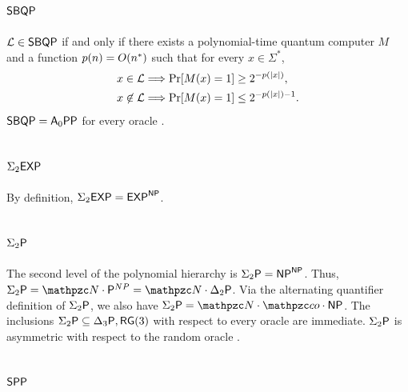\subsection{$\mathsf{SBQP}$}

$\mathcal{L}\in\mathsf{SBQP}$ if and only if there exists a polynomial-time quantum 
computer $M$ and a function $p(n)=O(n^*)$ such that for every $x\in\Sigma^*$,
\begin{align*}
x\in\mathcal{L}&\Longrightarrow\Pr[M(x)=1]\geq 2^{-p(|x|)}, \\
x\not\in\mathcal{L}&\Longrightarrow\Pr[M(x)=1]\leq 2^{-p(|x|)-1}.
\end{align*}
$\mathsf{SBQP}=\mathsf{A}_0\mathsf{PP}$ for every oracle \cite{kuperberg2009hard}.

\subsection{$\Sigma_2\mathsf{EXP}$}

By definition, $\Sigma_2\mathsf{EXP}=\mathsf{EXP}^{\mathsf{NP}}$.

\subsection{$\Sigma_2\mathsf{P}$}

The second level of the polynomial hierarchy is $\Sigma_2\mathsf{P}=\mathsf{NP}^{\mathsf{NP}}$. Thus, 
$\Sigma_2\sP=\cN\cdot\sP^{NP}=\cN\cdot\Delta_2\sP$. Via the alternating 
quantifier definition of $\Sigma_2\mathsf{P}$, we also have 
$\Sigma_2\sP=\cN\cdot\cco\cdot\NP$. The inclusions 
$\Sigma_2\mathsf{P}\subseteq\Delta_3\mathsf{P},\mathsf{RG}(3)$ with respect to every oracle are 
immediate. $\Sigma_2\mathsf{P}$ is asymmetric with respect to the random oracle 
\cite{rossman2015average}.

\subsection{$\mathsf{SPP}$}

